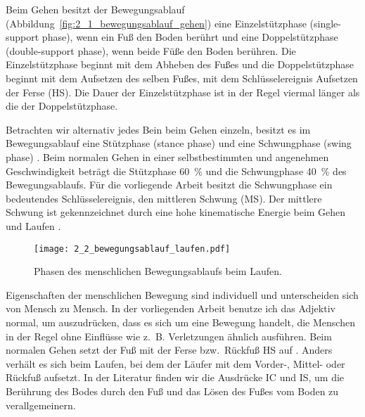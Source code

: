 Beim Gehen besitzt der Bewegungsablauf (Abbildung~\ref{fig:2_1_bewegungsablauf_gehen}) eine Einzelstützphase (single-support phase), wenn ein Fuß den Boden berührt und eine Doppelstützphase (double-support phase), wenn beide Füße den Boden berühren. Die Einzelstützphase beginnt mit dem Abheben des Fußes und die Doppelstützphase beginnt mit dem Aufsetzen des selben Fußes, mit dem Schlüsselereignis Aufsetzen der Ferse (\ac{HS}). Die Dauer der Einzelstützphase ist in der Regel viermal länger als die der Doppelstützphase. 

Betrachten wir alternativ jedes Bein beim Gehen einzeln, besitzt es im Bewegungsablauf eine Stützphase (stance phase) und eine Schwungphase (swing phase) \citep[][]{Bartlett2007}. Beim normalen Gehen in einer selbstbestimmten und angenehmen Geschwindigkeit beträgt die Stützphase 60~\% und die Schwungphase 40~\% des Bewegungsablaufs. Für die vorliegende Arbeit besitzt die Schwungphase ein bedeutendes Schlüsselereignis, den mittleren Schwung (\ac{MS}). Der mittlere Schwung ist gekennzeichnet durch eine hohe kinematische Energie beim Gehen und Laufen \citep[][]{Novacheck1998}.
\begin{figure}
	[t] \centering 
	\texttt{[image: 2\_2\_bewegungsablauf\_laufen.pdf]} \caption[Phasen des menschlichen Bewegungsablaufs beim Laufen]{Phasen des menschlichen Bewegungsablaufs beim Laufen.}\label{fig:2_2_bewegungsablauf_laufen} 
\end{figure}

Eigenschaften der menschlichen Bewegung sind individuell und unterscheiden sich von Mensch zu Mensch. In der vorliegenden Arbeit benutze ich das Adjektiv normal, um auszudrücken, dass es sich um eine Bewegung handelt, die Menschen in der Regel ohne Einflüsse wie z.~B. Verletzungen ähnlich ausführen. Beim normalen Gehen setzt der Fuß mit der Ferse bzw.\ Rückfuß \ac{HS} auf \citep[][S.~33]{Marquardt2011}. Anders verhält es sich beim Laufen, bei dem der Läufer mit dem Vorder-, Mittel- oder Rückfuß aufsetzt. In der Literatur finden wir die Ausdrücke \ac{IC} und \ac{IS}, um die Berührung des Bodes durch den Fuß und das Lösen des Fußes vom Boden zu verallgemeinern.

